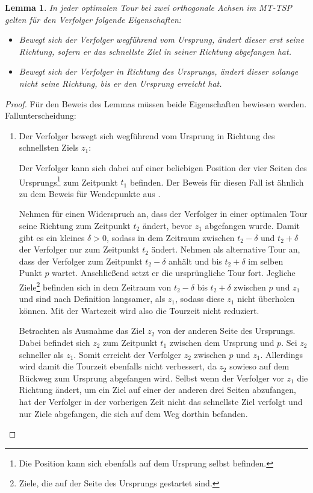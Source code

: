 \documentclass[german,version-2019-11]{uzl-thesis}
\newtheorem{lem}{Lemma}
\begin{document}
\begin{lem}
\label{lem:2}
In jeder optimalen Tour bei zwei orthogonale Achsen im MT-TSP gelten für den Verfolger folgende Eigenschaften:
\begin{itemize}
\item
Bewegt sich der Verfolger wegführend vom Ursprung, ändert dieser erst seine Richtung, sofern er das schnellste Ziel in seiner Richtung abgefangen hat.
\item
Bewegt sich der Verfolger in Richtung des Ursprungs, ändert dieser solange nicht seine Richtung, bis er den Ursprung erreicht hat.
\end{itemize}
\end{lem}

\begin{proof}
Für den Beweis des Lemmas müssen beide Eigenschaften bewiesen werden. Fallunterscheidung:
\begin{enumerate}
\item 
Der Verfolger bewegt sich wegführend vom Ursprung in Richtung des schnellsten Ziels $z_1$: 

Der Verfolger kann sich dabei auf einer beliebigen Position der vier Seiten des Ursprungs\footnote{Die Position kann sich ebenfalls auf dem Ursprung selbst befinden.} zum Zeitpunkt $t_1$ befinden. Der Beweis für diesen Fall ist ähnlich zu dem Beweis für Wendepunkte aus \cite{helvig}.

Nehmen für einen Widerspruch an, dass der Verfolger in einer optimalen Tour seine Richtung zum Zeitpunkt $t_2$ ändert, bevor $z_1$ abgefangen wurde. Damit gibt es ein kleines $\delta>0$, sodass in dem Zeitraum zwischen $t_2-\delta$ und $t_2+\delta$ der Verfolger nur zum Zeitpunkt $t_2$ ändert. Nehmen als alternative Tour an, dass der Verfolger zum Zeitpunkt $t_2-\delta$ anhält und bis $t_2+\delta$ im selben Punkt $p$ wartet. Anschließend setzt er die ursprüngliche Tour fort. Jegliche Ziele\footnote{Ziele, die auf der Seite des Ursprungs gestartet sind.} befinden sich in dem Zeitraum von $t_2-\delta$ bis $t_2+\delta$ zwischen $p$ und $z_1$ und sind nach Definition langsamer, als $z_1$, sodass diese $z_1$ nicht überholen können. Mit der Wartezeit wird also die Tourzeit nicht reduziert.

Betrachten als Ausnahme das Ziel $z_2$ von der anderen Seite des Ursprungs. Dabei befindet sich  $z_2$ zum Zeitpunkt $t_1$ zwischen dem Ursprung und $p$. Sei $z_2$ schneller als $z_1$. Somit erreicht der Verfolger $z_2$ zwischen $p$ und $z_1$. Allerdings wird damit die Tourzeit ebenfalls nicht verbessert, da $z_2$ sowieso auf dem Rückweg zum Ursprung abgefangen wird. 
Selbst wenn der Verfolger vor $z_1$ die Richtung ändert, um ein Ziel auf einer der anderen drei Seiten abzufangen, hat der Verfolger in der vorherigen Zeit nicht das schnellste Ziel verfolgt und nur Ziele abgefangen, die sich auf dem Weg dorthin befanden. 


\end{enumerate}
\end{proof}
\end{document}
